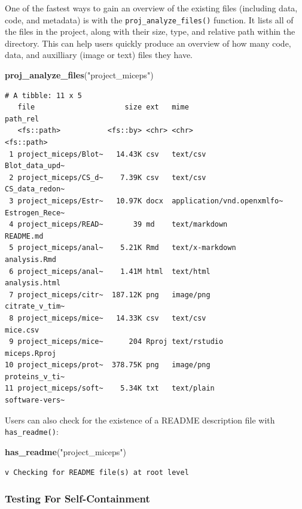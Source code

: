 \documentclass[12pt,twoside]{reedthesis}
\newenvironment{Shaded}{\begin{snugshade}}{\end{snugshade}}
\newcommand{\KeywordTok}[1]{\textcolor[rgb]{0.13,0.29,0.53}{\textbf{#1}}}
\newcommand{\StringTok}[1]{\textcolor[rgb]{0.31,0.60,0.02}{#1}}
\newcommand{\NormalTok}[1]{#1}
\begin{document}
One of the fastest ways to gain an overview of the existing files
(including data, code, and metadata) is with the
\texttt{proj\_analyze\_files()} function. It lists all of the files in
the project, along with their size, type, and relative path within the
directory. This can help users quickly produce an overview of how many
code, data, and auxilliary (image or text) files they have.
\begin{Shaded}
\begin{Highlighting}[]
\KeywordTok{proj_analyze_files}\NormalTok{(}\StringTok{"project_miceps"}\NormalTok{)}
\end{Highlighting}
\end{Shaded}
\begin{verbatim}
# A tibble: 11 x 5
   file                     size ext   mime                       path_rel      
   <fs::path>           <fs::by> <chr> <chr>                      <fs::path>    
 1 project_miceps/Blot~   14.43K csv   text/csv                   Blot_data_upd~
 2 project_miceps/CS_d~    7.39K csv   text/csv                   CS_data_redon~
 3 project_miceps/Estr~   10.97K docx  application/vnd.openxmlfo~ Estrogen_Rece~
 4 project_miceps/READ~       39 md    text/markdown              README.md     
 5 project_miceps/anal~    5.21K Rmd   text/x-markdown            analysis.Rmd  
 6 project_miceps/anal~    1.41M html  text/html                  analysis.html 
 7 project_miceps/citr~  187.12K png   image/png                  citrate_v_tim~
 8 project_miceps/mice~   14.33K csv   text/csv                   mice.csv      
 9 project_miceps/mice~      204 Rproj text/rstudio               miceps.Rproj  
10 project_miceps/prot~  378.75K png   image/png                  proteins_v_ti~
11 project_miceps/soft~    5.34K txt   text/plain                 software-vers~
\end{verbatim}
Users can also check for the existence of a README description file with
\texttt{has\_readme()}:
\begin{Shaded}
\begin{Highlighting}[]
\KeywordTok{has_readme}\NormalTok{(}\StringTok{"project_miceps"}\NormalTok{)}
\end{Highlighting}
\end{Shaded}
\begin{verbatim}
v Checking for README file(s) at root level
\end{verbatim}
\subsubsection{Testing For
Self-Containment}\label{testing-for-self-containment}
\end{document}

